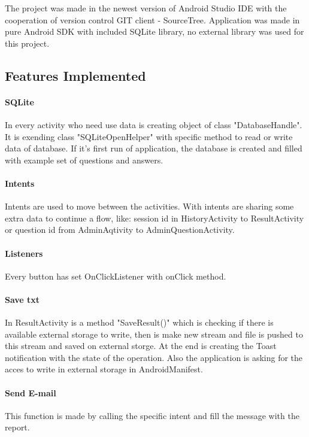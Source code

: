 \documentclass[conference]{IEEEtran}
\begin{document}
The project was made in the newest version of Android Studio IDE with the cooperation of version control GIT client - SourceTree. Application was made in pure Android SDK with included SQLite library, no external library was used for this project. 

\subsection{Features Implemented}

\paragraph{SQLite} In every activity who need use data is creating object of class "DatabaseHandle". It is exending class "SQLiteOpenHelper" with specific method to read or write data of database. If it's first run of application, the database is created and filled with example set of questions and answers.

\paragraph{Intents} Intents are used to move between the activities. With intents are sharing some extra data to continue a flow, like: session id in HistoryActivity to ResultActivity or question id from AdminAqtivity to AdminQuestionActivity.

\paragraph{Listeners} Every button has set OnClickListener with onClick method.

\paragraph{Save txt} In ResultActivity is a method "SaveResult()" which is checking if there is available external storage to write, then is make new stream and file is pushed to this stream and saved on external storge. At the end is creating the Toast notification with the state of the operation. Also the application is asking for the acces to write in external storage in AndroidManifest.

\paragraph{Send E-mail} This function is made by calling the specific intent and fill the message with the report.
\end{document}

